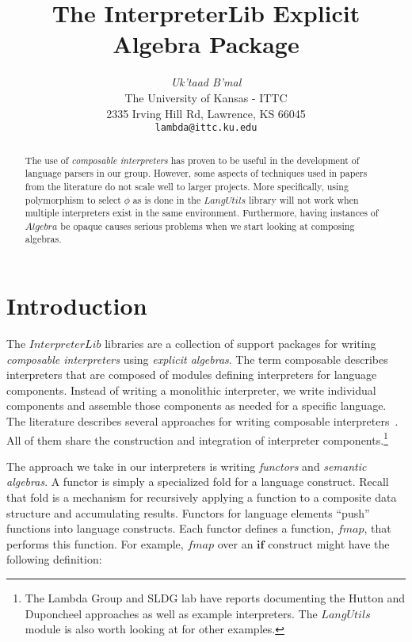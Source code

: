 \documentclass[10pt]{article}
\title{The InterpreterLib Explicit Algebra Package}
\author{\emph{Uk'taad B'mal} \\
  The University of Kansas - ITTC \\
  2335 Irving Hill Rd, Lawrence, KS 66045 \\
  \texttt{lambda@ittc.ku.edu}}
\newcommand{\Conid}[1]{\mathit{#1}}
\newcommand{\Varid}[1]{\mathit{#1}}
\begin{document}
\maketitle

\begin{abstract}

The use of \emph{composable interpreters} has proven to be useful in
the development of language parsers in our group.  However, some
aspects of techniques used in papers from the literature do not scale
well to larger projects.  More specifically, using polymorphism to
select \ensuremath{\Varid{\phi}} as is done in the \ensuremath{\Conid{LangUtils}} library will not work when
multiple interpreters exist in the same environment.  Furthermore,
having instances of \ensuremath{\Conid{Algebra}} be opaque causes serious problems when
we start looking at composing algebras.

\end{abstract}

\section{Introduction}

The \ensuremath{\Conid{InterpreterLib}} libraries are a collection of support packages
for writing \emph{composable interpreters} using \emph{explicit
  algebras}.  The term composable describes interpreters that are
composed of modules defining interpreters for language components.
Instead of writing a monolithic interpreter, we write individual
components and assemble those components as needed for a specific
language.  The literature describes several approaches for writing
composable
interpreters~\cite{Liang:96:Modular-Denotat,Espinosa:95:Semantic-Lego,Duponcheel::Using-catamorph,Jones:93:Composing-Monad,Steele:94:Building-interp}.
All of them share the construction and integration of interpreter
components.\footnote{The Lambda Group and SLDG lab have reports
  documenting the Hutton and Duponcheel approaches as well as example
  interpreters.  The \ensuremath{\Conid{LangUtils}} module is also worth looking at for
  other examples.}

The approach we take in our interpreters is writing \emph{functors}
and \emph{semantic algebras}.  A functor is simply a specialized fold
for a language construct.  Recall that fold is a mechanism for
recursively applying a function to a composite data structure and
accumulating results.  Functors for language elements ``push''
functions into language constructs.  Each functor defines a function,
\ensuremath{\Varid{fmap}}, that performs this function.  For example, \ensuremath{\Varid{fmap}} over an \ensuremath{\mathbf{if}}
construct might have the following definition:
\end{document}
